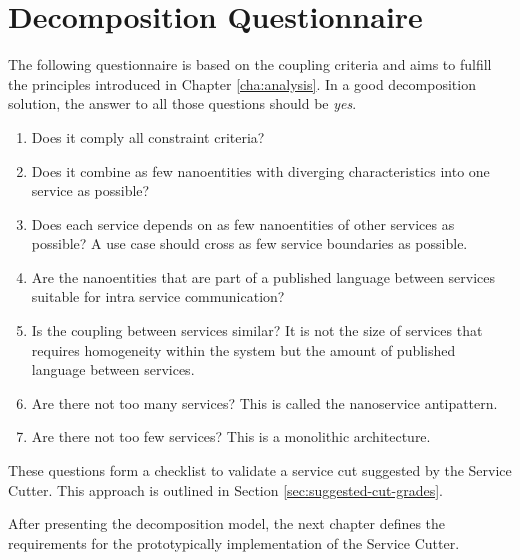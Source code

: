 \clearpage

\section{Decomposition Questionnaire}
\label{sec:decompositionRequirements}

The following questionnaire is based on the coupling criteria and aims to fulfill the principles introduced in Chapter \ref{cha:analysis}. In a good decomposition solution, the answer to all those questions should be \textit{yes}.

\begin{enumerate} 
	\item Does it comply all constraint criteria?
	\item Does it combine as few nanoentities with diverging characteristics into one service as possible?
	\item Does each service depends on as few nanoentities of other services as possible? A use case should cross as few service boundaries as possible. %
	\item Are the nanoentities that are part of a published language between services suitable for intra service communication?
	\item Is the coupling between services similar? It is not the size of services that requires homogeneity within the system but the amount of published language between services. 
	\item Are there not too many services? This is called the nanoservice antipattern\cite{nanoservice}.
	\item Are there not too few services? This is a monolithic architecture.
\end{enumerate}

These questions form a checklist to validate a service cut suggested by the Service Cutter. This approach is outlined in Section \ref{sec:suggested-cut-grades}.

\bigskip
After presenting the decomposition model, the next chapter defines the requirements for the prototypically implementation of the Service Cutter.  
